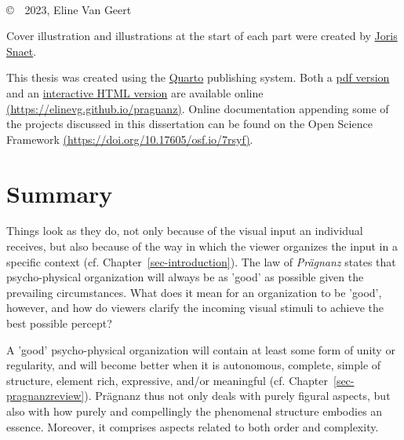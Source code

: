 
\clearpage\thispagestyle{empty}

\
\clearpage\thispagestyle{empty}


\clearpage\thispagestyle{empty}

\vspace*{\fill}
\noindent
\copyright \ \ 2023, Eline Van Geert

\noindent
Cover illustration and illustrations at the start of each part were created by \href{http://jorissnaet.be/}{Joris Snaet}.

\noindent
This thesis was created using the \href{https://quarto.org/}{Quarto} publishing system. Both a \href{https://elinevg.github.io/pragnanz/doctoralthesis_EVG.pdf}{pdf version} and an \href{https://elinevg.github.io/pragnanz}{interactive HTML version} are available online \href{https://elinevg.github.io/pragnanz}{(https://elinevg.github.io/pragnanz)}. Online documentation appending some of the projects discussed in this dissertation can be found on the Open Science Framework \href{https://doi.org/10.17605/OSF.IO/7RSYF}{(https://doi.org/10.17605/osf.io/7rsyf)}. 


\disableboldchapterintoc
\chapter*{Summary}

Things look as they do, not only because of the visual input an individual receives, but also because of the way in which the viewer organizes the input in a specific context (cf. Chapter~\ref{sec-introduction}). The law of \textit{Prägnanz} states that psycho-physical organization will always be as 'good' as possible given the prevailing circumstances. What does it mean for an organization to be 'good', however, and how do viewers clarify the incoming visual stimuli to achieve the best possible percept? 

A 'good' psycho-physical organization will contain at least some form of unity or regularity, and will become better when it is autonomous, complete, simple of structure, element rich, expressive, and/or meaningful (cf. Chapter~\ref{sec-pragnanzreview}). Prägnanz thus not only deals with purely figural aspects, but also with how purely and compellingly the phenomenal structure embodies an essence. Moreover, it comprises aspects related to both order and complexity. 

